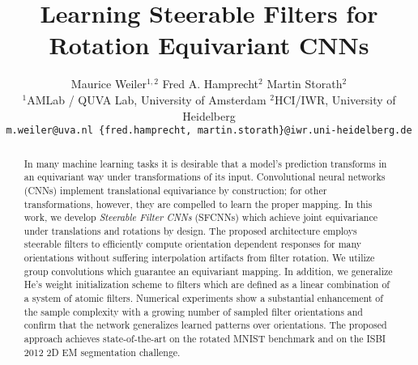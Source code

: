 \documentclass[10pt,twocolumn,letterpaper]{article}
\begin{document}
\title{Learning Steerable Filters for Rotation Equivariant CNNs}

\author{Maurice Weiler$^{1,2}$ \qquad Fred A. Hamprecht$^{2}$ \qquad Martin Storath$^{2}$\\
	$^1$AMLab / QUVA Lab, University of Amsterdam \qquad $^2$HCI/IWR, University of Heidelberg\\
	{\tt\small m.weiler@uva.nl \qquad  \{fred.hamprecht, martin.storath\}@iwr.uni-heidelberg.de}
}

\maketitle

\begin{abstract}
	In many machine learning tasks it is desirable that a model's prediction transforms in an equivariant way under transformations of its input.
	Convolutional neural networks (CNNs) implement translational equivariance by construction; for other transformations, however, they are compelled to learn the proper mapping.
	In this work, we develop \emph{Steerable Filter CNNs} (\mbox{SFCNNs}) which achieve joint equivariance under translations and rotations by design.
	The proposed architecture employs steerable filters to efficiently compute orientation dependent responses for many orientations without suffering interpolation artifacts from filter rotation.
	We utilize group convolutions which guarantee an equivariant mapping.
	In addition, we generalize He's weight initialization scheme to filters which are defined as a linear combination of a system of atomic filters.
	Numerical experiments show a substantial enhancement of the sample complexity with a growing number of sampled filter orientations and confirm that the network generalizes learned patterns over orientations.
	The proposed approach achieves state-of-the-art on the rotated MNIST benchmark and on the ISBI 2012 2D EM segmentation challenge.
\end{abstract}


\vspace{-1.0ex}
\end{document}
